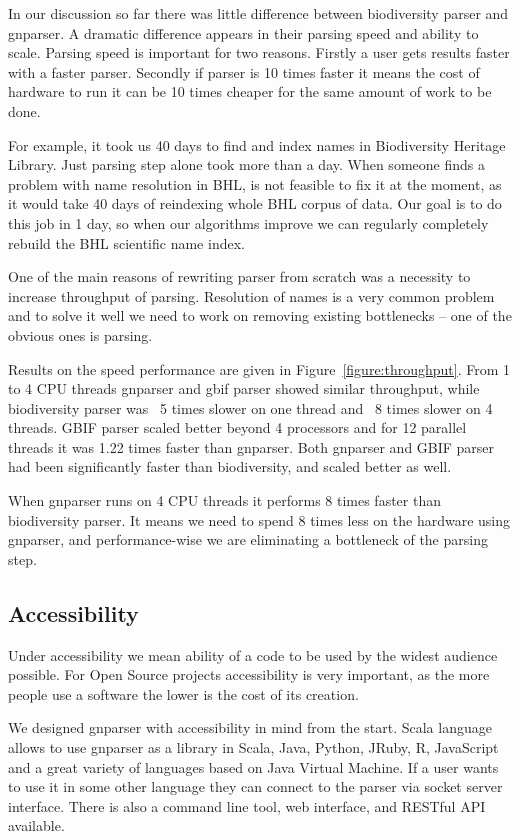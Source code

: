 \documentclass{bmcart}
\begin{document}
In our discussion so far there was little difference between biodiversity
parser and gnparser. A dramatic difference appears in their parsing speed and
ability to scale. Parsing speed is important for two reasons. Firstly a user
gets results faster with a faster parser. Secondly if parser is 10 times
faster it means the cost of hardware to run it can be 10 times cheaper for the
same amount of work to be done.

For example, it took us 40 days to find and index names in Biodiversity
Heritage Library. Just parsing step alone took more than a day. When someone
finds a problem with name resolution in BHL, is not feasible to fix it at the
moment, as it would take 40 days of reindexing whole BHL corpus of data. Our
goal is to do this job in 1 day, so when our algorithms improve we can
regularly completely rebuild the BHL scientific name index.

One of the main reasons of rewriting parser from scratch was a necessity to
increase throughput of parsing. Resolution of names is a very common problem
and to solve it well we need to work on removing existing bottlenecks -- one
of the obvious ones is parsing.

Results on the speed performance are given in Figure~\ref{figure:throughput}.
From 1 to 4 CPU threads gnparser and gbif parser showed similar throughput,
while biodiversity parser was ~5 times slower on one thread and ~8 times
slower on 4 threads. GBIF parser scaled better beyond 4 processors and for 12
parallel threads it was 1.22 times faster than gnparser. Both gnparser and
GBIF parser had been significantly faster than biodiversity, and scaled better
as well.

When gnparser runs on 4 CPU threads it performs 8 times faster than
biodiversity parser. It means we need to spend 8 times less on the hardware
using gnparser, and performance-wise we are eliminating a bottleneck of the
parsing step.

\subsection*{Accessibility}

Under accessibility we mean ability of a code to be used by the widest
audience possible. For Open Source projects accessibility is very important,
as the more people use a software the lower is the cost of its creation.

We designed gnparser with accessibility in mind from the start.  Scala
language allows to use gnparser as a library in Scala, Java, Python, JRuby, R,
JavaScript and a great variety of languages based on Java Virtual Machine. If
a user wants to use it in some other language they can connect to the parser
via socket server interface. There is also a command line tool, web interface,
and RESTful API available.
\end{document}
